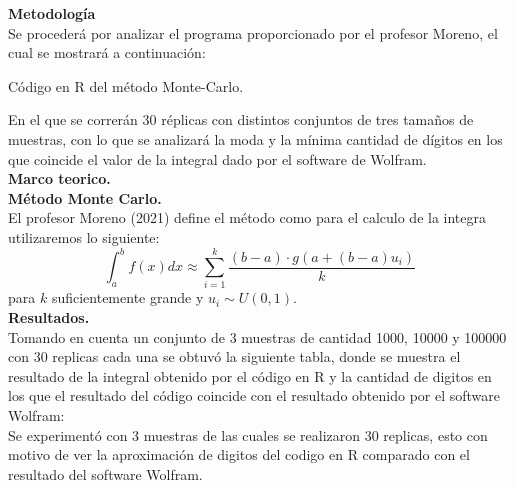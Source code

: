 \documentclass{report}
\begin{document}
\noindent \Large \textbf{Metodología} \\

\noindent Se procederá por analizar el programa proporcionado por el profesor Moreno, el cual se mostrará a continuación:

\begin{table}[h]
    \resizebox{8.5cm}{!}{
    
    }
	\caption{Código en R del método Monte-Carlo.}
	\label{cod:montearloR}
\end{table}

 \noindent En el que se correrán 30 réplicas con distintos conjuntos de tres tamaños de muestras, con lo que se analizará la moda y la mínima cantidad de dígitos en los que coincide el valor de la integral dado por el software de Wolfram. \\


\noindent \Large \textbf{Marco teorico.} \\

\noindent \Large \textbf{Método Monte Carlo.} \\

\noindent El profesor Moreno (2021) define el método como para el calculo de la integra utilizaremos lo siguiente:
$$\int_{a}^{b}f(x)dx \approx \sum_{i=1}^{k}\frac{(b-a)\cdot g(a+(b-a)u_{i})}{k}$$
para $k$ suficientemente grande y $u_{i}\sim U(0,1)$. \\


\noindent \Large \textbf{Resultados.} \\

\noindent Tomando en cuenta un conjunto de 3 muestras de cantidad 1000, 10000 y 100000 con 30 replicas cada una se obtuvó la siguiente tabla, donde se muestra el resultado de la integral obtenido por el código en R y la cantidad de digitos en los que el resultado del código coincide con el resultado obtenido por el software Wolfram: \\

\noindent Se experimentó con 3 muestras de las cuales se realizaron 30 replicas, esto con motivo de ver la aproximación de digitos del codigo en R comparado con el resultado del software Wolfram. \\
\end{document}
